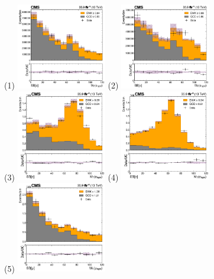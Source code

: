 \begin{figure}
  \centering
  \subfigure(1) \includegraphics[width=0.35\textwidth]{template_fit/2016/mt_low_Electron_15.0.png} \hfill
  \subfigure(2) \includegraphics[width=0.35\textwidth]{template_fit/2016/mt_low_Electron_20.0.png} \\
  \subfigure(3) \includegraphics[width=0.35\textwidth]{template_fit/2016/mt_high_Electron_25.0.png} \hfill
  \subfigure(4) \includegraphics[width=0.35\textwidth]{template_fit/2016/mt_high_Electron_45.0.png} \\
  \subfigure(5) \includegraphics[width=0.35\textwidth]{template_fit/2016/mt_low_Muon_15.0.png} \hfill

\end{figure}
